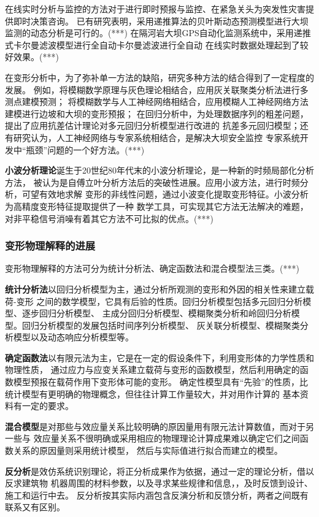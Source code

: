 在线实时分析与监控的方法对于进行即时预报与监控、在紧急关头为突发性灾害提供即时决策咨询。
已有研究表明，采用递推算法的贝叶斯动态预测模型进行大坝监测的动态分析是可行的。(***)
在隔河岩大坝GPS自动化监测系统中，采用递推式卡尔曼滤波模型进行全自动卡尔曼滤波进行全自动
在线实时数据处理起到了较好效果。(***)

在变形分析中，为了弥补单一方法的缺陷，研究多种方法的结合得到了一定程度的发展。
例如，将模糊数学原理与灰色理论相结合，应用灰关联聚类分析法进行多测点建模预测；
将模糊数学与人工神经网络相结合，应用模糊人工神经网络方法建模进行边坡和大坝的变形预报；
在回归分析中，为处理数据序列的粗差问题，提出了应用抗差估计理论对多元回归分析模型进行改进的
抗差多元回归模型；还有研究认为，人工神经网络与专家系统相结合，是解决大坝安全监控
专家系统开发中“瓶颈”问题的一个好方法。(***)

\textbf{小波分析理论}诞生于20世纪80年代末的小波分析理论，是一种新的时频局部化分析方法，
被认为是自傅立叶分析方法后的突破性进展。应用小波方法，进行时频分析，可望有效地求解
变形的非线性问题，通过小波变化提取变形特征。小波分析为高精度变形特征提取提供了一种
数学工具，可实现其它方法无法解决的难题，对非平稳信号消噪有着其它方法不可比拟的优点。(***)

\subsubsection{变形物理解释的进展}
变形物理解释的方法可分为统计分析法、确定函数法和混合模型法三类。(***)

\textbf{统计分析法}以回归分析模型为主，通过分析所观测的变形和外因的相关性来建立载荷-变形
之间的数学模型，它具有后验的性质。回归分析模型包括多元回归分析模型、逐步回归分析模型、
主成分回归分析模型、模糊聚类分析和岭回归分析模型。回归分析模型的发展包括时间序列分析模型、
灰关联分析模型、模糊聚类分析模型以及动态响应分析模型等。

\textbf{确定函数法}以有限元法为主，它是在一定的假设条件下，利用变形体的力学性质和物理性质，
通过应力与应变关系建立载荷与变形的函数模型，然后利用确定的函数模型预报在载荷作用下变形体可能的变形。
确定性模型具有“先验”的性质，比统计模型有更明确的物理概念，但往往计算工作量较大，并对用作计算的
基本资料有一定的要求。

\textbf{混合模型}是对那些与效应量关系比较明确的原因量用有限元法计算数值，而对于另一些与
效应量关系不很明确或采用相应的物理理论计算成果难以确定它们之间函数关系的原因量则采用统计模型，
然后与实际值进行拟合而建立的模型。

\textbf{反分析}是效仿系统识别理论，将正分析成果作为依据，通过一定的理论分析，借以反求建筑物
机器周围的材料参数，以及寻求某些规律和信息，，及时反馈到设计、施工和运行中去。
反分析按其实际内涵包含反演分析和反馈分析，两者之间既有联系又有区别。

